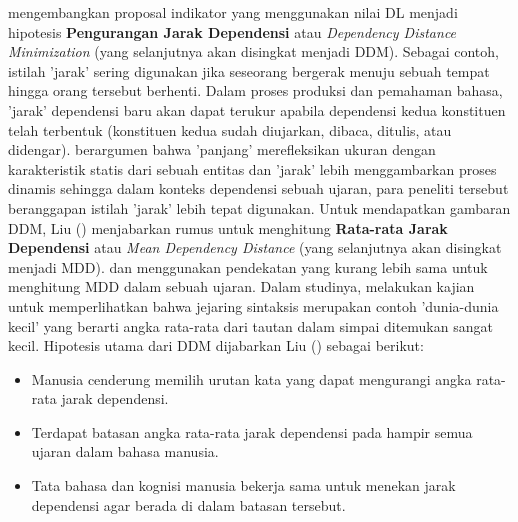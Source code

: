 \cite{liu2017dependency} mengembangkan proposal indikator yang menggunakan nilai DL menjadi hipotesis \textbf{Pengurangan Jarak Dependensi} atau \textit{Dependency Distance Minimization} (yang selanjutnya akan disingkat menjadi DDM). Sebagai contoh, istilah 'jarak' sering digunakan jika seseorang bergerak menuju sebuah tempat hingga orang tersebut berhenti. Dalam proses produksi dan pemahaman bahasa, 'jarak' dependensi baru akan dapat terukur apabila dependensi kedua konstituen telah terbentuk (konstituen kedua sudah diujarkan, dibaca, ditulis, atau didengar).  \cite{liu2017dependency} berargumen bahwa 'panjang' merefleksikan ukuran dengan karakteristik statis dari sebuah entitas dan 'jarak' lebih menggambarkan proses dinamis sehingga dalam konteks dependensi sebuah ujaran, para peneliti tersebut beranggapan istilah 'jarak' lebih tepat digunakan. Untuk mendapatkan gambaran DDM, Liu (\citealp{liu2008dependency, liu2017dependency}) menjabarkan rumus untuk menghitung \textbf{Rata-rata Jarak Dependensi} atau \textit{Mean Dependency Distance} (yang selanjutnya akan disingkat menjadi MDD). \cite{hudson2010introduction} dan \cite{i2004euclidean} menggunakan pendekatan yang kurang lebih sama untuk menghitung MDD dalam sebuah ujaran. Dalam studinya, \cite{i2004patterns} melakukan kajian untuk memperlihatkan bahwa jejaring sintaksis merupakan contoh 'dunia-dunia kecil' yang berarti angka rata-rata dari tautan dalam simpai ditemukan sangat kecil. Hipotesis utama dari DDM dijabarkan Liu (\citealp{liu2008dependency, liu2017dependency}) sebagai berikut:

\begin{itemize}
\item Manusia cenderung memilih urutan kata yang dapat mengurangi angka rata-rata jarak dependensi.
\item Terdapat batasan angka rata-rata jarak dependensi pada hampir semua ujaran dalam bahasa manusia.
\item Tata bahasa dan kognisi manusia bekerja sama untuk menekan jarak dependensi agar berada di dalam batasan tersebut.
\end{itemize}

